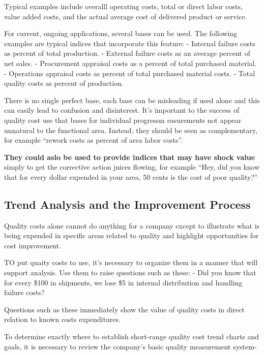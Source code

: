 \documentclass[11pt]{article}
\begin{document}
Typical examples include overalll operating costs, total or direct labor
costs, value added costs, and the actual average cost of delivered
product or service.

For current, ongoing applications, several bases can be used. The
following examples are typical indices that incorporate this feature: -
Internal failure costs as percent of total production. - External
failure costs as an average percent of net sales. - Procurement
appraisal costs as a percent of total purchased material. - Operations
appraisal costs as percent of total purchased material costs. - Total
quality costs as percent of production.

There is no single perfect base, each base can be misleading if used
alone and this can easily lead to confusion and disinterest. It's
important to the success of quality cost use that bases for individual
progressm easurements not appear unnatural to the functional area.
Instead, they should be seen as complementary, for example ``rework
costs as percent of area labor costs''.

\textbf{They could aslo be used to provide indices that may have shock
value} simply to get the corrective action juices flowing, for example
``Hey, did you know that for every dollar expended in your area, 50
cents is the cost of poor quality?''

\hypertarget{trend-analysis-and-the-improvement-process}{%
\subsection{Trend Analysis and the Improvement
Process}\label{trend-analysis-and-the-improvement-process}}

Quality costs alone cannot do anything for a company except to
illustrate what is being expended in specific areas related to quality
and highlight opportunities for cost improvement.

TO put quaity costs to use, it's necessary to organize them in a manner
that will support analysis. Use them to raise questions such as these: -
Did you know that for every \$100 in shipments, we lose \$5 in internal
distribution and handling failure costs?

Questions such as these immediately show the value of quality costs in
direct relation to known costs expenditures.

To determine exactly where to establish short-range quality cost trend
charts and goals, it is necessary to review the company's basic quality
measurement system-
\end{document}
